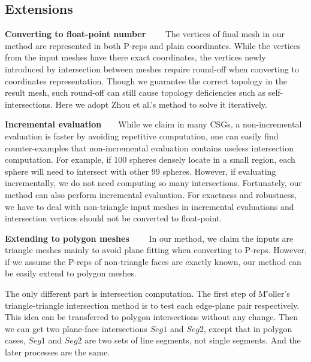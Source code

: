 \documentclass[10pt,journal,compsoc]{IEEEtran}
\begin{document}
\fi

\subsection{Extensions}

\vspace{0.5em}
\noindent\textbf{Converting to float-point number}~~~~
The vertices of final mesh in our method are represented in both P-reps and plain coordinates. While the vertices from the input meshes have there exact coordinates, the vertices newly introduced by intersection between meshes require round-off when converting to coordinates representation. Though we guarantee the correct topology in the result mesh, such round-off can still cause topology deficiencies such as self-intersections. Here we adopt Zhou et al.'s method \cite{zhou2016mesh} to solve it iteratively.

\vspace{0.5em}
\noindent\textbf{Incremental evaluation}~~~~While we claim in many CSGs, a non-incremental evaluation is faster by avoiding repetitive computation, one can easily find counter-examples that non-incremental evaluation contains useless intersection computation. For example, if 100 spheres densely locate in a small region, each sphere will need to intersect with other 99 spheres. However, if evaluating incrementally, we do not need computing so many intersections. Fortunately, our method can also perform incremental evaluation. For exactness and robustness, we have to deal with non-triangle input meshes in incremental evaluations and intersection vertices should not be converted to float-point.


\vspace{0.5em}
\noindent\textbf{Extending to polygon meshes}~~~~
In our method, we claim the inputs are triangle meshes mainly to avoid plane fitting when converting to P-reps. However, if we assume the P-reps of non-triangle faces are exactly known, our method can be easily extend to polygon meshes.


\vspace{0.5em}\noindent The only different part is intersection computation. The first step of M\''{o}ller's triangle-triangle intersection method is to test each edge-plane pair respectively. This idea can be transferred to polygon intersections without any change. Then we can get two plane-face intersections $Seg1$ and $Seg2$, except that in polygon cases, $Seg1$ and $Seg2$ are two sets of line segments, not single segments. And the later processes are the same.
\end{document}
